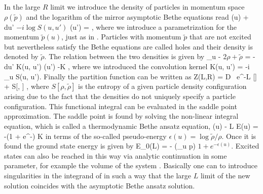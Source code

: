 In the large $R$ limit we introduce the density of particles in momentum space $\rho(\tilde{p})$ and the logarithm of the mirror asymptotic Bethe equations read
\beq
	(u) + \int du' \( -i \log S(u, u') \) \rho(u') = ,
\eeq
where we introduce a parametrization for the momentum $\tilde{p}(u)$, just as in . 
Particles with momentum $\tilde{p}$ that are not excited but nevertheless satisfy the Bethe equations are called holes and their density is denoted by $\tilde{\rho}$.
The relation between the two densities is given by
\beq
	\partial_u  - 2\pi \( \rho + \tilde \rho \) = - \int du' K(u, u') \rho(u') \equiv -K \star \rho,
\eeq
where we introduced the convolution kernel
\beq
	K(u, u') = -i \partial_u \log S(u, u').
\eeq
Finally the partition function can be written as
\beq
	Z(L,R) = \int \mathcal D \rho \, e^{-L [\rho] + S[\rho, \tilde{\rho}] },
\eeq
where $S[\rho, \tilde{\rho}]$ is the entropy of a given particle density configuration arising due to the fact that the densities do not uniquely specify a particle configuration.
This functional integral can be evaluated in the saddle point approximation. 
The saddle point is found by solving the non-linear integral equation, which is called a thermodynamic Bethe ansatz equation,
\beq
	\label{eq:simple_tba}
	\epsilon(u) - L \tilde E(u) = -\log (1 + e^{-\epsilon}) \star K
\eeq
in terms of the so-called pseudo-energy $\epsilon(u) = \log \tilde{\rho} / \rho$. 
Once it is found the ground state energy is given by
\beq
	E_0(L) = - \int {} (\partial_u \tilde p) \log \(1 + e^{-\epsilon(u)}\).
\eeq
Excited states can also be reached in this way via analytic continuation in some parameter, for example the volume of the system \cite{Dorey:1996re}.
Basically one can to introduce singularities in the integrand of  in such a way that the large $L$ limit of the new solution coincides with the asymptotic Bethe ansatz solution.

